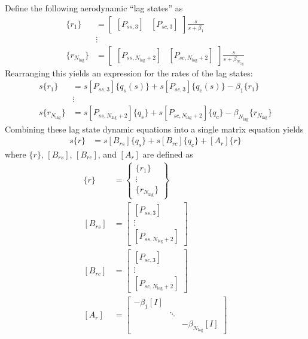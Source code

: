Define the following aerodynamic ``lag states'' as
\begin{equation}
\begin{aligned}
	\{r_1\} &= \begin{bmatrix} [P_{ss,3}] & [P_{sc,3}] \end{bmatrix} \frac{s}{s+\beta_1} \\
	&\vdots \\
	\{r_{N_\text{lag}}\} &= \begin{bmatrix} [P_{ss,N_\text{lag}+2}] & [P_{sc,N_\text{lag}+2}] \end{bmatrix} \frac{s}{s+\beta_{N_\text{lag}}}
\end{aligned}
\end{equation}
Rearranging this yields an expression for the rates of the lag states:
\begin{equation}
\begin{aligned}
	s \{r_1\} &= s [P_{ss,3}] \{q_s(s)\} + s [P_{sc,3}] \{q_c(s)\} - \beta_1 \{r_1\} \\
	&\vdots \\
	s \{r_{N_\text{lag}}\} &= s [P_{ss,N_\text{lag}+2}] \{q_s\} + s [P_{sc,N_\text{lag}+2}] \{q_c\} - \beta_{N_\text{lag}} \{r_{N_\text{lag}}\}
\end{aligned}
\end{equation}
Combining these lag state dynamic equations into a single matrix equation yields
\begin{align}
	\label{eq:lagDynamics}
	s\{r\} &= s [B_{rs}] \{q_s\} + s [B_{rc}] \{q_c\} + [A_r] \{r\}
\end{align}
where $\{r\}$, $[B_{rs}]$, $[B_{rc}]$, and $[A_r]$ are defined as
\begin{equation}
\begin{aligned}
	\{r\} &= \begin{Bmatrix} \{r_1\} \\ \vdots \\ \{r_{N_\text{lag}}\} \end{Bmatrix} \\
	[B_{rs}] &= \begin{bmatrix} [P_{ss,3}] \\ \vdots \\ [P_{ss,N_\text{lag}+2}] \end{bmatrix} \\
	[B_{rc}] &= \begin{bmatrix} [P_{sc,3}] \\ \vdots \\ [P_{sc,N_\text{lag}+2}] \end{bmatrix}	\\
	[A_r] &= \begin{bmatrix}
	-\beta_1 [I] & & \\
	& \ddots & \\
	& & -\beta_{N_\text{lag}} [I]
	\end{bmatrix}
\end{aligned}
\end{equation}

